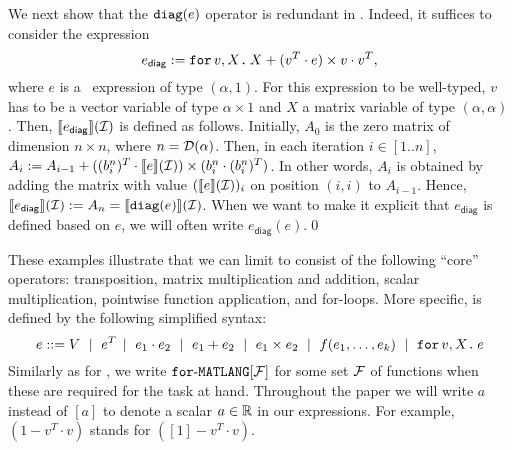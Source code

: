 \begin{example}\label{ex:diag}
We next show that the $\texttt{diag}(e)$ operator is redundant in \langfor.
Indeed, it suffices to consider the expression
$$e_{\mathsf{diag}}:=
\texttt{for}\, v,X \texttt{.}\, X + (v^T\cdot e) \times v\cdot v^T,$$ where $e$ is a \langfor\  expression of type $(\alpha,1)$. For this expression to be well-typed, $v$ has to be a vector variable of type $\alpha\times 1$ and $X$ a matrix variable of type $(\alpha,\alpha)$. Then, $\llbracket e_{\mathsf{diag}} \rrbracket(\mathcal{I})$ is defined as follows.
Initially, $A_0$ is the zero matrix of dimension $n\times n$, where $n=\mathcal{D}(\alpha)$. Then, in each iteration
$i\in[1..n]$, $A_{i}:=A_{i-1}+  ((b_i^n)^T\cdot\llbracket e \rrbracket(\mathcal{I}))\times (b_i^n\cdot (b_i^n)^T)$. In other words, $A_i$ is obtained by adding the matrix with value $(\llbracket e \rrbracket(\mathcal{I}))_i$ on position $(i,i)$ to $A_{i-1}$. Hence, $\llbracket e_{\mathsf{diag}} \rrbracket(\mathcal{I}):=A_n=\llbracket \texttt{diag}(e) \rrbracket(\mathcal{I})$. When we want to make it explicit that $e_\mathsf{diag}$ is defined based on $e$, we will often write $e_\mathsf{diag}(e)$.\qed
 \end{example}

These examples illustrate that we can limit \langfor to consist of the following ``core'' operators: transposition, matrix multiplication and addition, scalar multiplication, pointwise function application, and for-loops. More specific, \langfor is defined by the following simplified syntax:
$$
e ::= V \ \mid \ e^T \!\ \mid \ e_1 \cdot e_2 \ \mid \ e_1 + e_2 \ \mid \ e_1\times e_2  \ \mid \  f(e_1,\ldots ,e_k) \ \mid \ \texttt{for}\, v,X \texttt{.}\, e
$$
Similarly as for \lang, we write $\texttt{for}\text{-}\texttt{MATLANG}[\mathcal{F}]$ for some set $\mathcal{F}$ of functions when these are required for the task at hand. Throughout the paper we will write $a$ instead of $[a]$ to denote a scalar $a\in\mathbb{R}$ in our expressions. For example,  $(1-v^T\cdot v)$ stands for  $([1]-v^T\cdot v)$. %

